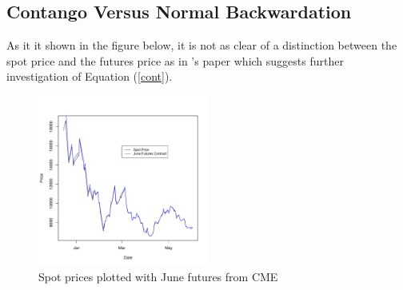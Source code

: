 \documentclass{paper}
\let\oldref\ref
\renewcommand{\ref}[1]{(\oldref{#1})}
\begin{document}
\begin{doublespacing}
\subsection{Contango Versus Normal Backwardation}
As it it shown in the figure below, it is not as clear of a distinction between the spot price and the futures price as in \citeauthor{ozvatic2015}'s paper which suggests further investigation of Equation \ref{cont}.
\begin{figure}[H]
\centering
\includegraphics[width=0.5\textwidth]{SpotvFut.pdf}
\caption{Spot prices plotted with June futures from CME}\label{spotfut}
\end{figure}


\end{doublespacing}
\end{document}
